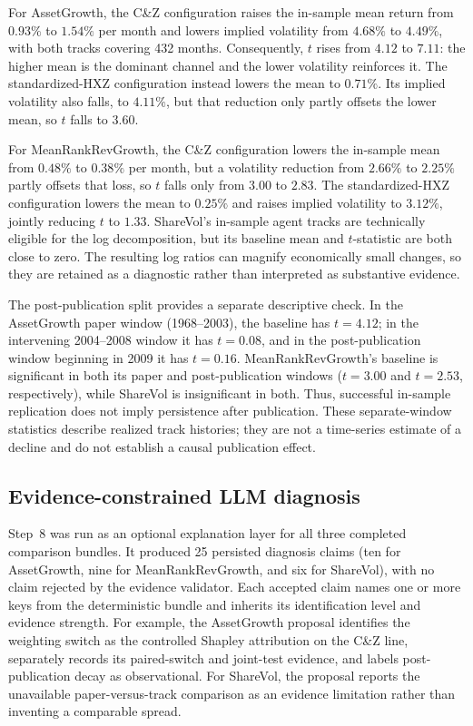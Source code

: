 For AssetGrowth, the C\&Z configuration raises the in-sample mean return from
$0.93\%$ to $1.54\%$ per month and lowers implied volatility from $4.68\%$ to
$4.49\%$, with both tracks covering 432 months. Consequently, $t$ rises from
$4.12$ to $7.11$: the higher mean is the dominant channel and the lower
volatility reinforces it. The standardized-HXZ configuration instead lowers
the mean to $0.71\%$. Its implied volatility also falls, to $4.11\%$, but
that reduction only partly offsets the lower mean, so $t$ falls to $3.60$.

For MeanRankRevGrowth, the C\&Z configuration lowers the in-sample mean from
$0.48\%$ to $0.38\%$ per month, but a volatility reduction from $2.66\%$ to
$2.25\%$ partly offsets that loss, so $t$ falls only from $3.00$ to $2.83$.
The standardized-HXZ configuration lowers the mean to $0.25\%$ and raises
implied volatility to $3.12\%$, jointly reducing $t$ to $1.33$. ShareVol's
in-sample agent tracks are technically eligible for the log decomposition,
but its baseline mean and $t$-statistic are both close to zero. The resulting
log ratios can magnify economically small changes, so they are retained as a
diagnostic rather than interpreted as substantive evidence.

The post-publication split provides a separate descriptive check. In the
AssetGrowth paper window (1968--2003), the baseline has $t=4.12$; in the
intervening 2004--2008 window it has $t=0.08$, and in the post-publication
window beginning in 2009 it has $t=0.16$. MeanRankRevGrowth's baseline is
significant in both its paper and post-publication windows ($t=3.00$ and
$t=2.53$, respectively), while ShareVol is insignificant in both. Thus,
successful in-sample replication does not imply persistence after publication.
These separate-window statistics describe realized track histories; they are
not a time-series estimate of a decline and do not establish a causal
publication effect.

\subsection{Evidence-constrained LLM diagnosis}

Step~8 was run as an optional explanation layer for all three completed
comparison bundles. It produced 25 persisted diagnosis claims (ten for
AssetGrowth, nine for MeanRankRevGrowth, and six for ShareVol), with no
claim rejected by the evidence validator. Each accepted claim names one or
more keys from the deterministic bundle and inherits its identification level
and evidence strength. For example, the AssetGrowth proposal identifies the
weighting switch as the controlled Shapley attribution on the C\&Z line,
separately records its paired-switch and joint-test evidence, and labels
post-publication decay as observational. For ShareVol, the proposal reports
the unavailable paper-versus-track comparison as an evidence limitation rather
than inventing a comparable spread.

